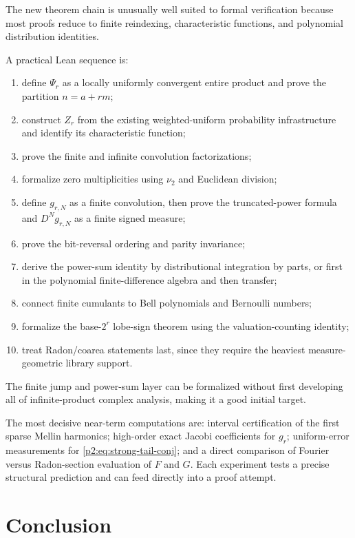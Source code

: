 \documentclass[11pt,oneside]{article}
\theoremstyle{definition}
\begin{document}
The new theorem chain is unusually well suited to formal verification because
most proofs reduce to finite reindexing, characteristic functions, and
polynomial distribution identities.

A practical Lean sequence is:
\begin{enumerate}
\item define $\Psi_r$ as a locally uniformly convergent entire product and
      prove the partition $n=a+rm$;
\item construct $Z_r$ from the existing weighted-uniform probability
      infrastructure and identify its characteristic function;
\item prove the finite and infinite convolution factorizations;
\item formalize zero multiplicities using $\nu_2$ and Euclidean division;
\item define $g_{r,N}$ as a finite convolution, then prove the truncated-power
      formula and $D^Ng_{r,N}$ as a finite signed measure;
\item prove the bit-reversal ordering and parity invariance;
\item derive the power-sum identity by distributional integration by parts,
      or first in the polynomial finite-difference algebra and then transfer;
\item connect finite cumulants to Bell polynomials and Bernoulli numbers;
\item formalize the base-$2^r$ lobe-sign theorem using the valuation-counting
      identity;
\item treat Radon/coarea statements last, since they require the heaviest
      measure-geometric library support.
\end{enumerate}
The finite jump and power-sum layer can be formalized without first developing
all of infinite-product complex analysis, making it a good initial target.

\begin{frontierbox}
The most decisive near-term computations are: interval certification of the
first sparse Mellin harmonics; high-order exact Jacobi coefficients for
$g_r$; uniform-error measurements for \eqref{p2:eq:strong-tail-conj}; and a direct
comparison of Fourier versus Radon-section evaluation of $F$ and $G$.  Each
experiment tests a precise structural prediction and can feed directly into a
proof attempt.
\end{frontierbox}

\section{Conclusion}
\label{p2:sec:conclusion}
\end{document}
